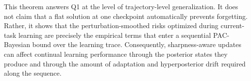 \documentclass{article}
\begin{document}
This theorem answers Q1 at the level of trajectory-level generalization.
It does not claim that a flat solution at one checkpoint automatically prevents forgetting.
Rather, it shows that the perturbation-smoothed risks optimized during current-task learning are precisely the empirical terms that enter a sequential PAC-Bayesian bound over the learning trace.
Consequently, sharpness-aware updates can affect continual learning performance through the posterior states they produce and through the amount of adaptation and hyperposterior drift required along the sequence.



\end{document}
